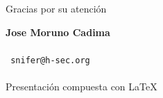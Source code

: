 \documentclass[12pt]{beamer} %
\makeatletter
\def\autor{
  Jose Moruno Cadima\\
}
\def\email{
  snifer@h-sec.org\\

}
\makeatother
\begin{document}



\begin{blankslide}
  \vspace{1cm}
  \begin{center}
    {\Large Gracias por su atención}
  \end{center}
  \vspace{1cm}
  \begin{flushright}
    {\bf \autor}\\
    {\tt \email}\\[0.5cm]
    {\scriptsize Presentación compuesta con \LaTeX\ }
  \end{flushright}
\end{blankslide}
\end{document}
